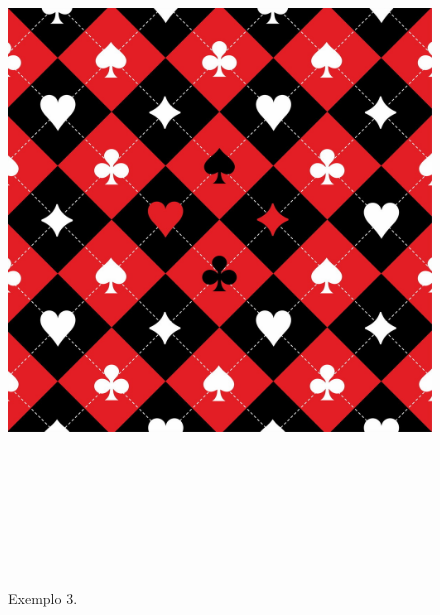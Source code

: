 \documentclass[a4paper,12pt]{article}
\begin{document}
\begin{figure}[!htp]
\centering
\includegraphics[width=\linewidth, height = 19.305cm]{Nipes.jpg}
\caption{Exemplo 3.}
\end{figure}
\end{document}

